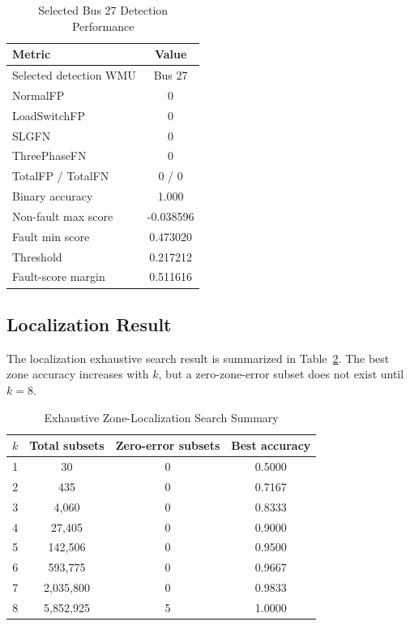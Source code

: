 \documentclass[conference]{IEEEtran}
\begin{document}
\begin{table}[t]
\caption{Selected Bus 27 Detection Performance}
\label{tab:bus27}
\centering
\begin{tabular}{lc}
\toprule
Metric & Value\\
\midrule
Selected detection WMU & Bus 27\\
NormalFP & 0\\
LoadSwitchFP & 0\\
SLGFN & 0\\
ThreePhaseFN & 0\\
TotalFP / TotalFN & 0 / 0\\
Binary accuracy & 1.000\\
Non-fault max score & -0.038596\\
Fault min score & 0.473020\\
Threshold & 0.217212\\
Fault-score margin & 0.511616\\
\bottomrule
\end{tabular}
\end{table}

\subsection{Localization Result}

The localization exhaustive search result is summarized in Table~\ref{tab:locsearch}. The best zone accuracy increases with $k$, but a zero-zone-error subset does not exist until $k=8$.

\begin{table}[t]
\caption{Exhaustive Zone-Localization Search Summary}
\label{tab:locsearch}
\centering
\begin{tabular}{cccc}
\toprule
$k$ & Total subsets & Zero-error subsets & Best accuracy\\
\midrule
1 & 30 & 0 & 0.5000\\
2 & 435 & 0 & 0.7167\\
3 & 4,060 & 0 & 0.8333\\
4 & 27,405 & 0 & 0.9000\\
5 & 142,506 & 0 & 0.9500\\
6 & 593,775 & 0 & 0.9667\\
7 & 2,035,800 & 0 & 0.9833\\
8 & 5,852,925 & 5 & 1.0000\\
\bottomrule
\end{tabular}
\end{table}
\end{document}
